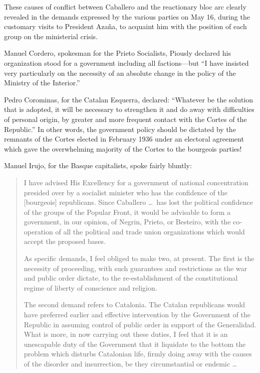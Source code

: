 \dinkus

These causes of conflict between Caballero and the reactionary bloc arc clearly revealed in the demands expressed by the various parties on May 16, during the customary visits to President Azaña, to acquaint him with the position of each group on the ministerial crisis.

Manuel Cordero, spokesman for the Prieto Socialists, Piously declared his organization stood for a government including all fac\-tions---but ``I have insisted very particularly on the necessity of an absolute change in the policy of the Ministry of the Interior.''

Pedro Corominas, for the Catalan Esquerra, declared: ``Whatever be the solution that is adopted, it will be necessary to strengthen it and do away with difficulties of personal origin, by greater and more frequent contact with the Cortes of the Republic.'' In other words, the government policy should be dictated by the remnants of the Cortes elected in February 1936 under an electoral agreement which gave the overwhelming majority of the Cortes to the bourgeois parties!

Manuel Irujo, for the Basque capitalists, spoke fairly bluntly:

\begin{quotation}
  I have advised His Excellency for a government of national concentration presided over by a socialist minister who has the confidence of the [bourgeois] republicans. Since Caballero \dots\ has lost the political confidence of the groups of the Popular Front, it would be advisable to form a government, in our opinion, of Negrin, Prieto, or Besteiro, with the co-operation of all the political and trade union organizations which would accept the proposed bases.
  
  As specific demands, I feel obliged to make two, at present. The first is the necessity of proceeding, with such guarantees and restrictions as the war and public order dictate, to the re-establishment of the constitutional regime of liberty of conscience and religion.
  
  The second demand refers to Catalonia. The Catalan republicans would have preferred earlier and effective intervention by the Government of the Republic in assuming control of public order in support of the Generalidad. What is more, in now carrying out these duties, I feel that it is an unescapable duty of the Government that it liquidate to the bottom the problem which disturbs Catalonian life, firmly doing away with the causes of the disorder and insurrection, be they circumstantial or endemic \dots
\end{quotation}

